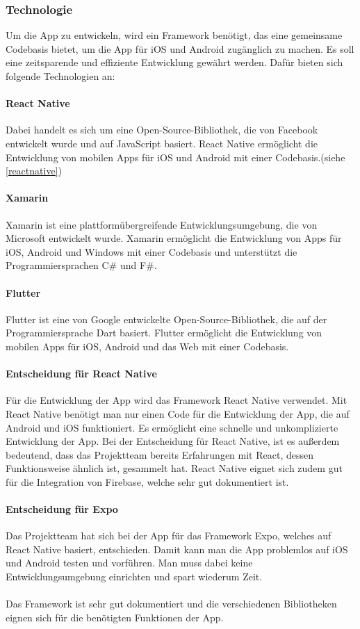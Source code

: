 \subsubsection{Technologie}
Um die App zu entwickeln, wird ein \Gls{Framework} benötigt, das eine gemeinsame Codebasis bietet, um die App für iOS und Android zugänglich zu machen. Es soll eine zeitsparende und effiziente Entwicklung gewährt werden. Dafür bieten sich folgende Technologien an:\\

\paragraph{React Native}Dabei handelt es sich um eine \Gls{Open-Source}-Bibliothek, die von Facebook entwickelt wurde und auf JavaScript basiert. React Native ermöglicht die Entwicklung von mobilen Apps für iOS und Android mit einer Codebasis.(siehe \ref*{reactnative})
\paragraph{Xamarin} Xamarin ist eine plattformübergreifende Entwicklungsumgebung, die von Microsoft entwickelt wurde. Xamarin ermöglicht die Entwicklung von Apps für iOS, Android und Windows mit einer Codebasis und unterstützt die Programmiersprachen C\# und F\#. \cite{vergleich}
\paragraph{Flutter} Flutter ist eine von Google entwickelte \Gls{Open-Source}-Bibliothek, die auf der Programmiersprache Dart basiert. Flutter ermöglicht die Entwicklung von mobilen Apps für iOS, Android und das Web mit einer Codebasis.\cite{flutter}


\paragraph{Entscheidung für React Native}Für die Entwicklung der App wird das Framework React Native verwendet. Mit React Native benötigt man nur einen Code für die Entwicklung der App, die auf Android und iOS funktioniert. Es ermöglicht eine schnelle und unkomplizierte Entwicklung der App. Bei der Entscheidung für React Native, ist es außerdem bedeutend, dass das Projektteam bereits Erfahrungen mit React, dessen Funktionsweise ähnlich ist, gesammelt hat. React Native eignet sich zudem gut für die Integration von Firebase, welche sehr gut dokumentiert ist.\cite{reactnative}\\

\paragraph{Entscheidung für Expo}Das Projektteam hat sich bei der App für das Framework Expo, welches auf React Native basiert, entschieden. Damit kann man die App problemlos auf iOS und Android testen und vorführen. Man muss dabei keine Entwicklungsumgebung einrichten und spart wiederum Zeit.\\ \\
Das Framework ist sehr gut dokumentiert und die verschiedenen Bibliotheken eignen sich für die benötigten Funktionen der App.\\
